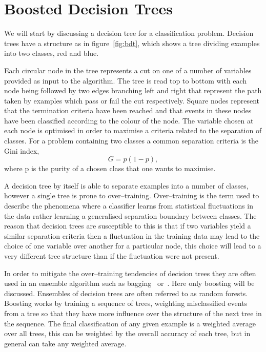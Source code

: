 \section{Boosted Decision Trees}%
\label{sec:bdts}
We will start by discussing a decision tree for a classification problem.
Decision trees have a structure as in figure~\ref{fig:bdt}, which shows a tree
dividing examples into two classes, red and blue.

Each circular node in the tree represents a cut on one of a number of variables
provided as input to the algorithm. The tree is read top to bottom with each
node being followed by two edges branching left and right that represent the
path taken by examples which pass or fail the cut respectively. Square nodes
represent that the termination criteria have been reached and that events in
these nodes have been classified according to the colour of the node. The
variable chosen at each node is optimised in order to maximise a criteria
related to the separation of classes.  For a problem containing two classes a
common separation criteria is the Gini index,
\begin{equation}
  G = p(1-p),
  \label{eq:gini}
\end{equation}
where p is the purity of a chosen class that one wants to maximise.

A decision tree by itself is able to separate examples into a number of classes,
however a single tree is prone to over--training. Over--training is the term
used to describe the phenomena where a classifier learns from statistical
fluctuations in the data rather learning a generalised separation boundary
between classes. The reason that decision trees are susceptible to this is that
if two variables yield a similar separation criteria then a fluctuation in the
training data may lead to the choice of one variable over another for a
particular node, this choice will lead to a very different tree structure than
if the fluctuation were not present.

In order to mitigate the over--training tendencies of decision trees they are
often used in an ensemble algorithm such as bagging~\cite{bagging}
or~\cite{boosting}. Here only boosting will be discussed. Ensembles of decision
trees are often referred to as random forests. Boosting works by training a
sequence of trees, weighting misclassified events from a tree so that they have
more influence over the structure of the next tree in the sequence. The final
classification of any given example is a weighted average over all trees, this
can be weighted by the overall accuracy of each tree, but in general can take
any weighted average.

